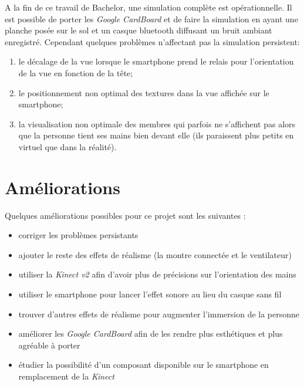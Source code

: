 A la fin de ce travail de Bachelor, une simulation complète est opérationnelle. Il est possible de porter les \textit{Google CardBoard} et de faire la simulation en ayant une planche posée sur le sol et un casque \textsf{bluetooth} diffusant un bruit ambiant enregistré. Cependant quelques problèmes n'affectant pas la simulation persistent: 
\begin{enumerate}
\item le décalage de la vue lorsque le \textsf{smartphone} prend le relais pour l'orientation de la vue en fonction de la tête;
\item le positionnement non optimal des textures dans la vue affichée sur le \textsf{smartphone};
\item la visualisation  non optimale des membres qui parfois ne s'affichent pas alors que la personne tient ses mains bien devant elle (ils paraissent plus petits en virtuel que dans la réalité).
\end{enumerate}


\section{Améliorations}
Quelques améliorations possibles pour ce projet sont les suivantes :
\begin{itemize}
\item corriger les problèmes persistants 
\item ajouter le reste des effets de réalisme (la montre connectée et le ventilateur)
\item utiliser la \textit{Kinect v2} afin d'avoir plus de précisions sur l'orientation des mains
\item utiliser le \textsf{smartphone} pour lancer l'effet sonore au lieu du casque sans fil
\item trouver d'autres effets de réalisme pour augmenter l'immersion de la personne 
\item améliorer les \textit{Google CardBoard} afin de les rendre plus esthétiques et plus agréable à porter
\item étudier la possibilité d'un composant disponible sur le \textsf{smartphone} en remplacement de la \textit{Kinect}
\end{itemize} 

